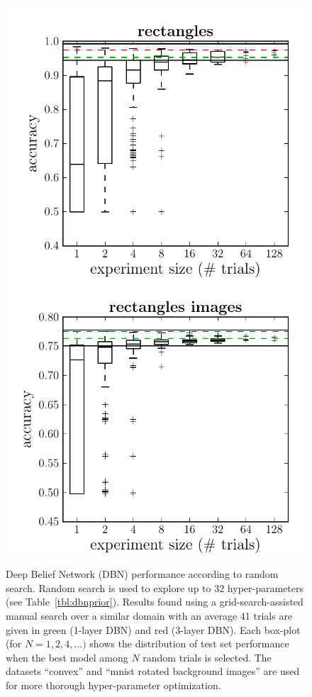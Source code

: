 \documentclass{article}
\newcommand{\vs}[1]{\vspace*{-#1mm}}
\begin{document}
\begin{figure}
\begin{minipage}{0.9\linewidth}
    \includegraphics[scale=0.37]{figures/dbn_efficiency/dbn_efficiency_rectangles}
    \includegraphics[scale=0.37]{figures/dbn_efficiency/dbn_efficiency_rectangles_images}
\vs{2}
    \caption
    {Deep Belief Network (DBN) performance according to random search.
    Random search is used to explore up to 32 hyper-parameters (see Table~\ref{tbl:dbnprior}).
    Results found using a grid-search-assisted manual search over a similar domain with
    an average 41 trials are given in green (1-layer DBN) and red (3-layer DBN).
    Each box-plot (for $N=1,2,4,...)$ shows the distribution of test set performance when the best model among
    $N$ random trials is selected. The datasets ``convex'' and ``mnist rotated
    background images'' are used for more thorough hyper-parameter
    optimization.
    }
    \label{fig:dbn_random_efficiency}
\end{minipage}
\vs{3}
\end{figure}
\end{document}
